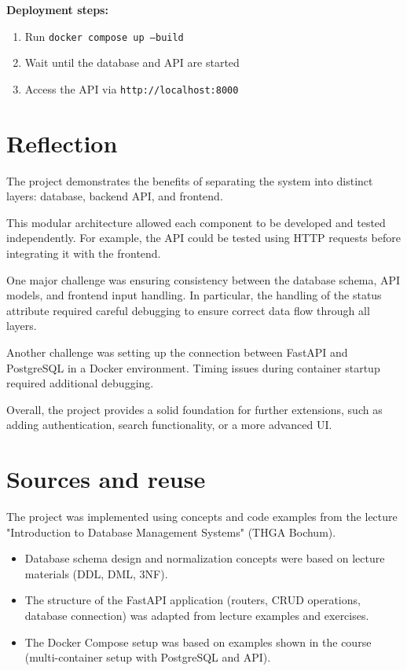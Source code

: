 \documentclass[11pt,a4paper]{article}
\begin{document}
\textbf{Deployment steps:}
\begin{enumerate}
\item Run \texttt{docker compose up --build}
\item Wait until the database and API are started
\item Access the API via \texttt{http://localhost:8000}
\end{enumerate}



\section{Reflection}


The project demonstrates the benefits of separating the system into distinct
layers: database, backend API, and frontend.

This modular architecture allowed each component to be developed and tested
independently. For example, the API could be tested using HTTP requests before
integrating it with the frontend.

One major challenge was ensuring consistency between the database schema,
API models, and frontend input handling. In particular, the handling of the
status attribute required careful debugging to ensure correct data flow
through all layers.

Another challenge was setting up the connection between FastAPI and PostgreSQL
in a Docker environment. Timing issues during container startup required
additional debugging.

Overall, the project provides a solid foundation for further extensions,
such as adding authentication, search functionality, or a more advanced UI.
\section*{Sources and reuse}


The project was implemented using concepts and code examples from the lecture
"Introduction to Database Management Systems" (THGA Bochum).

\begin{itemize}

  \item Database schema design and normalization concepts were based on lecture
        materials (DDL, DML, 3NF).

  \item The structure of the FastAPI application (routers, CRUD operations,
        database connection) was adapted from lecture examples and exercises.

  \item The Docker Compose setup was based on examples shown in the course
        (multi-container setup with PostgreSQL and API).

\end{itemize}
\end{document}
